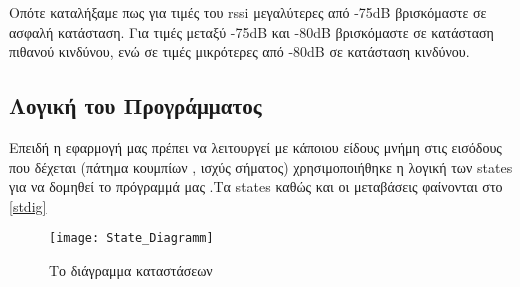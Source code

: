 Οπότε καταλήξαμε πως για τιμές του rssi μεγαλύτερες από -75dB βρισκόμαστε σε 
ασφαλή κατάσταση.
Για τιμές μεταξύ -75dB και -80dB βρισκόμαστε σε κατάσταση πιθανού 
κινδύνου, ενώ σε τιμές μικρότερες από -80dB σε κατάσταση κινδύνου.

\subsection{Λογική του Προγράμματος}
Επειδή η εφαρμογή μας πρέπει να λειτουργεί με κάποιου είδους μνήμη στις εισόδους που δέχεται (πάτημα κουμπίων , ισχύς σήματος) χρησιμοποιήθηκε η λογική των states για να δομηθεί το πρόγραμμά μας .Τα states καθώς και οι μεταβάσεις φαίνονται στο \ref{stdig}  
\renewcommand{\figurename}{Σχήμα}
\begin{figure}[htb]
    \centering
    \texttt{[image: State\_Diagramm]}
    \caption{Το διάγραμμα καταστάσεων }
    \label{fig:stdiag}
\end{figure}

